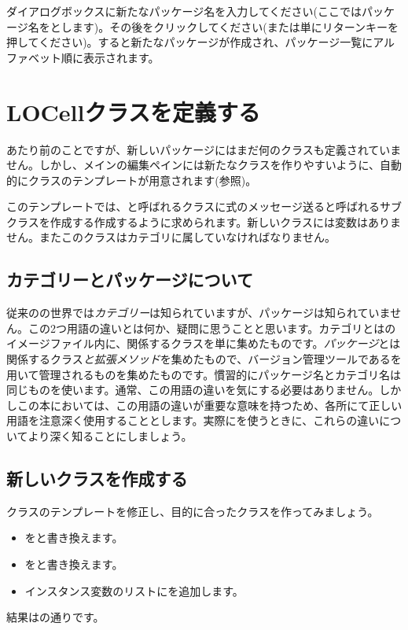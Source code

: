 \documentclass[a4paper,10pt,twoside]{book}
\begin{document}
ダイアログボックスに新たなパッケージ名を入力してください(ここではパッケージ名をとします)。その後をクリックしてください(または単にリターンキーを押してください)。すると新たなパッケージが作成され、パッケージ一覧にアルファベット順に表示されます。

\section{LOCellクラスを定義する}

あたり前のことですが、新しいパッケージにはまだ何のクラスも定義されていません。しかし、メインの編集ペインには新たなクラスを作りやすいように、自動的にクラスのテンプレートが用意されます(参照)。

このテンプレートでは、と呼ばれるクラスに\st{}式のメッセージ送ると呼ばれるサブクラスを作成する作成するように求められます。新しいクラスには変数はありません。またこのクラスはカテゴリに属していなければなりません。

\subsection{カテゴリーとパッケージについて}

従来の\st{}の世界では\emph{カテゴリー}は知られていますが、パッケージは知られていません。この2つ用語の違いとは何か、疑問に思うことと思います。カテゴリとは\st{}のイメージファイル内に、関係するクラスを単に集めたものです。\emph{パッケージ}とは関係するクラス\emph{と拡張メソッド}を集めたもので、バージョン管理ツールであるを用いて管理されるものを集めたものです。慣習的にパッケージ名とカテゴリ名は同じものを使います。通常、この用語の違いを気にする必要はありません。しかしこの本においては、この用語の違いが重要な意味を持つため、各所にて正しい用語を注意深く使用することとします。実際にを使うときに、これらの違いについてより深く知ることにしましょう。


\subsection{新しいクラスを作成する}

クラスのテンプレートを修正し、目的に合ったクラスを作ってみましょう。

\begin{itemize}
  \item {}をと書き換えます。
  \item {}をと書き換えます。
  \item インスタンス変数のリストにを追加します。
\end{itemize}
結果はの通りです。
\end{document}
